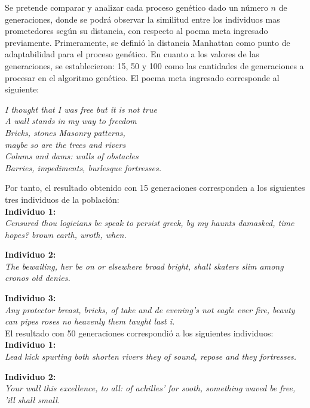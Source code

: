 \documentclass[journal]{IEEEtran}
\begin{document}
\begin{itemize}
	Se pretende comparar y analizar cada proceso genético dado un número $ n $ de generaciones, donde se podrá observar la similitud entre los individuos mas prometedores según su distancia,
	con respecto al poema meta ingresado previamente.
	Primeramente, se definió la distancia Manhattan como punto de adaptabilidad para el proceso genético. En cuanto a los valores de las generaciones, se establecieron: 
	15, 50 y 100 como las cantidades de generaciones a procesar en el algoritmo genético.
	El poema meta ingresado corresponde al siguiente: 
	
	\begin{center}
		\textit{I thought that 
			I was free but it is not true \\
			A wall stands in my way to freedom \\
			Bricks, stones Masonry patterns, \\
			maybe so are the trees and rivers \\
			Colums and dams: walls of obstacles \\
			Barries, impediments, burlesque fortresses.} \\
	\end{center}
	
	
	Por tanto, el resultado obtenido con 15 generaciones corresponden a los siguientes tres individuos de la población:\\
	
	\textbf{Individuo 1:} \\
	\textit{Censured thou logicians be speak to persist greek, by my haunts damasked, time hopes? brown earth, wroth, when.}     
	
	\textbf{Individuo 2:} \\
	\textit{The bewailing, her be on or elsewhere broad bright, shall skaters slim among cronos old denies.}
	
	\textbf{Individuo 3:} \\
	\textit{Any protector breast, bricks, of take and de evening's not eagle ever fire, beauty can pipes roses no heavenly them taught last i.} \\
	

	El resultado con 50 generaciones correspondió a los siguientes individuos: \\
	
	\textbf{Individuo 1:} \\
	\textit{Lead kick spurting both shorten rivers they of sound, repose and they fortresses.}
	
	\textbf{Individuo 2:} \\
	\textit{Your wall this excellence, to all: of achilles' for sooth, something waved be free, 'ill shall small.}
	

\end{itemize}
\end{document}
